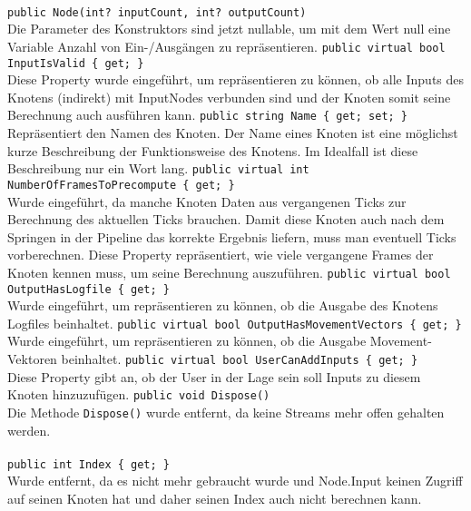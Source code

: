 \paragraph{}
\begin{itemize}
	\change \verb!public Node(int? inputCount, int? outputCount)! \\
	Die Parameter des Konstruktors sind jetzt nullable, um mit dem Wert null eine Variable Anzahl von Ein-/Ausgängen zu repräsentieren.
	\add \verb!public virtual bool InputIsValid { get; }! \\
	Diese Property wurde eingeführt, um repräsentieren zu können, ob alle Inputs des Knotens (indirekt) mit InputNodes verbunden sind und der Knoten somit seine Berechnung auch ausführen kann.
	\add \verb!public string Name { get; set; }! \\
	Repräsentiert den Namen des Knoten. Der Name eines Knoten ist eine möglichst kurze Beschreibung der Funktionsweise des Knotens. Im Idealfall ist diese Beschreibung nur ein Wort lang.
	\add \verb!public virtual int NumberOfFramesToPrecompute { get; }! \\
	Wurde eingeführt, da manche Knoten Daten aus vergangenen Ticks zur Berechnung des aktuellen Ticks brauchen. Damit diese Knoten auch nach dem Springen in der Pipeline das korrekte Ergebnis liefern, muss man eventuell Ticks vorberechnen. Diese Property repräsentiert, wie viele vergangene Frames der Knoten kennen muss, um seine Berechnung auszuführen.
	\add \verb!public virtual bool OutputHasLogfile { get; }! \\
	Wurde eingeführt, um repräsentieren zu können, ob die Ausgabe des Knotens Logfiles beinhaltet.
	\add \verb!public virtual bool OutputHasMovementVectors { get; }! \\
	Wurde eingeführt, um repräsentieren zu können, ob die Ausgabe Movement-Vektoren beinhaltet.
	\add \verb!public virtual bool UserCanAddInputs { get; }! \\
	Diese Property gibt an, ob der User in der Lage sein soll Inputs zu diesem Knoten hinzuzufügen.
	\remove \verb!public void Dispose()! \\
	Die Methode \verb!Dispose()! wurde entfernt, da keine Streams mehr offen gehalten werden.
\end{itemize}

\paragraph{}
\begin{itemize}
	\remove \verb!public int Index { get; }! \\
	Wurde entfernt, da es nicht mehr gebraucht wurde und Node.Input keinen Zugriff auf seinen Knoten hat und daher seinen Index auch nicht berechnen kann.	
\end{itemize}

